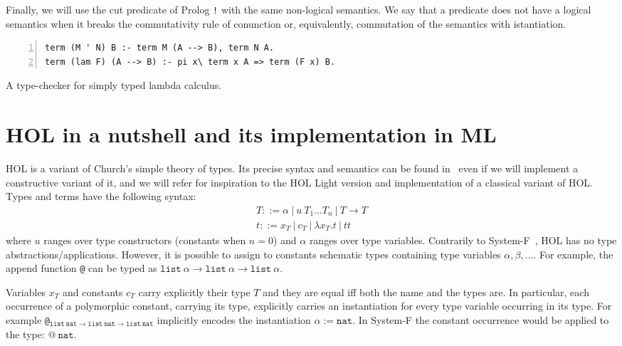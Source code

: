 \documentclass[preprint]{sigplanconf}
\begin{document}
Finally, we will use the cut predicate of Prolog \texttt{!} with the same
non-logical semantics. We say that a predicate does not have a logical semantics
when it breaks the commutativity rule of conunction or, equivalently, commutation of the semantics with istantiation.

\begin{table}[t]
\begin{small}
\begin{Verbatim}[numbers=left,numbersep=1pt,frame=leftline]
term (M ' N) B :- term M (A --> B), term N A.
term (lam F) (A --> B) :- pi x\ term x A => term (F x) B.
\end{Verbatim}
\end{small}
\caption{\label{type-checker1}A type-checker for simply typed lambda calculus.}
\end{table}

\section{HOL in a nutshell and its implementation in ML}
HOL is a variant of Church's simple theory of types. Its precise syntax and semantics can be found in~\cite{the_HOL_system_LOGIC} even if we will implement a constructive variant of it, and we will refer for inspiration to the HOL Light version and implementation of a classical variant of HOL. Types and terms have the
following syntax:
$$\begin{array}{l}
T ::= \alpha ~|~ u~T_1\ldots T_n ~|~ T \rightarrow T\\
t ::= x_T ~|~ c_T ~|~ \lambda x_T. t ~|~ tt
\end{array}$$
where $u$ ranges over type constructors (constants when $n=0$) and $\alpha$
ranges over type variables. Contrarily to System-F~\cite{???}, HOL has no type
abstractions/applications. However, it is possible to assign to constants
schematic types containing type variables $\alpha, \beta, \ldots$. For example,
the append function \texttt{@} can be typed as $\mathtt{list}~\alpha \rightarrow \mathtt{list}~\alpha \rightarrow \mathtt{list}~\alpha$.

Variables $x_T$ and constants $c_T$ carry explicitly their type $T$ and they are equal iff both the name and the types are. In particular, each occurrence of a polymorphic constant, carrying its type, explicitly carries an instantiation for every type variable occurring in its type. For example
\texttt{@}$_{\mathtt{list}~\mathtt{nat} \rightarrow \mathtt{list}~\mathtt{nat} \rightarrow \mathtt{list}~\mathtt{nat}}$ implicitly encodes the instantiation $\alpha := \mathtt{nat}$. In System-F the constant occurrence would be applied to the type: $\texttt{@}~\mathtt{nat}$.
\end{document}
